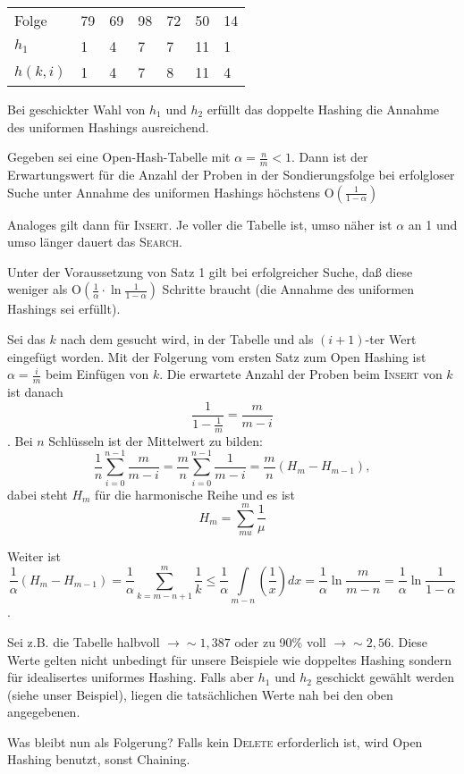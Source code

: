 \begin{tabular}{lllllll}
Folge & 79 & 69 & 98 & 72 & 50 & 14\\
$h_1$ & 1 & 4 & 7 & 7 & 11 & 1\\
$h(k,i)$ & 1 & 4 & 7 & 8 & 11 & 4\\
\end{tabular}

Bei geschickter Wahl von $h_1$ und $h_2$ erfüllt das doppelte Hashing die Annahme des uniformen Hashings ausreichend.
 
\begin{satz}
Gegeben sei eine Open-Hash-Tabelle mit $\alpha=\frac{n}{m}<1$. Dann ist der Erwartungswert für die Anzahl der Proben in
der Sondierungsfolge bei erfolgloser Suche unter Annahme des uniformen Hashings höchstens
O$\left(\frac{1}{1-\alpha}\right)$
\end{satz}
Analoges gilt dann für \textsc{Insert}. Je voller die Tabelle ist, umso näher ist $\alpha$ an 1 und umso länger
dauert das \textsc{Search}.

\begin{satz}
Unter der Voraussetzung von Satz 1 gilt bei erfolgreicher Suche, daß diese weniger als O$\left(\frac{1}{\alpha} \cdot
\ln{\frac{1}{1-\alpha}}\right)$ Schritte braucht (die Annahme des uniformen Hashings sei erfüllt).
\end{satz}

\begin{beweis}
Sei das $k$ nach dem gesucht wird, in der Tabelle und als $(i+1)$-ter Wert eingefügt worden. Mit der Folgerung vom
ersten Satz zum Open Hashing ist $\alpha=\frac{i}{m}$ beim Einfügen von $k$. Die erwartete Anzahl der Proben beim
\textsc{Insert} von $k$ ist danach \[\frac{1}{1-\frac{1}{m}}=\frac{m}{m-i}\]
. Bei $n$ Schlüsseln ist der Mittelwert zu bilden: 
\[\frac{1}{n} \sum_{i=0}^{n-1} \frac{m}{m-i}=\frac{m}{n} \sum_{i=0}^{n-1}
\frac{1}{m-i}=\frac{m}{n}\left(H_m-H_{m-1}\right),\] dabei steht $H_m$ für die harmonische Reihe und es ist
\[H_m=\sum_{mu}^{m}\frac{1}{\mu}\]

Weiter ist
\[\frac{1}{\alpha}\left(H_m-H_{m-1}\right)=\frac{1}{\alpha} \sum_{k=m-n+1}^m \frac{1}{k} \leq \frac{1}{\alpha}\int
\limits_{m-n}
\left(\frac{1}{x}\right)dx=\frac{1}{\alpha} \ln{\frac{m}{m-n}}=\frac{1}{\alpha}\ln{\frac{1}{1-\alpha}}\].
\end{beweis}

Sei z.B. die Tabelle halbvoll $\rightarrow \sim 1,387$ oder zu 90\% voll $\rightarrow \sim 2,56$. Diese Werte gelten
nicht unbedingt für unsere Beispiele wie doppeltes Hashing sondern für idealisertes uniformes Hashing. Falls aber
$h_1$ und $h_2$ geschickt gewählt werden (siehe unser Beispiel), liegen die tatsächlichen Werte nah bei den oben
angegebenen. 

Was bleibt nun als Folgerung? Falls kein \textsc{Delete} erforderlich ist, wird Open Hashing benutzt, sonst Chaining.

  
% 
%
